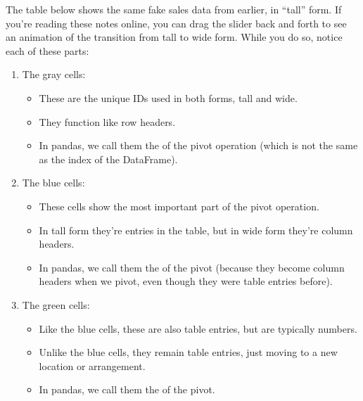 \documentclass[letterpaper,10pt,english]{jupyterBook}
\begin{document}
\sphinxAtStartPar
The table below shows the same fake sales data from earlier, in “tall” form.  If you’re reading these notes online, you can drag the slider back and forth to see an animation of the transition from tall to wide form.  While you do so, notice each of these parts:
\begin{enumerate}
%
\item {} 
\sphinxAtStartPar
The gray cells:
\begin{itemize}
\item {} 
\sphinxAtStartPar
These are the unique IDs used in both forms, tall and wide.

\item {} 
\sphinxAtStartPar
They function like row headers.

\item {} 
\sphinxAtStartPar
In pandas, we call them the  of the pivot operation (which is not the same as the index of the DataFrame).

\end{itemize}

\item {} 
\sphinxAtStartPar
The blue cells:
\begin{itemize}
\item {} 
\sphinxAtStartPar
These cells show the most important part of the pivot operation.

\item {} 
\sphinxAtStartPar
In tall form they’re entries in the table, but in wide form they’re column headers.

\item {} 
\sphinxAtStartPar
In pandas, we call them the  of the pivot (because they become column headers when we pivot, even though they were table entries before).

\end{itemize}

\item {} 
\sphinxAtStartPar
The green cells:
\begin{itemize}
\item {} 
\sphinxAtStartPar
Like the blue cells, these are also table entries, but are typically numbers.

\item {} 
\sphinxAtStartPar
Unlike the blue cells, they remain table entries, just moving to a new location or arrangement.

\item {} 
\sphinxAtStartPar
In pandas, we call them the  of the pivot.

\end{itemize}

\end{enumerate}
\end{document}
